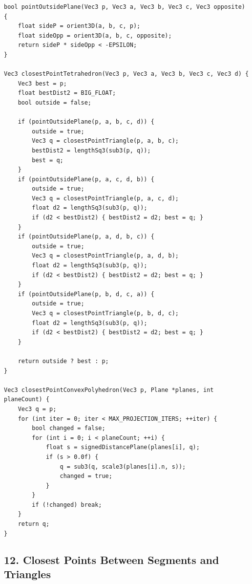 \documentclass[10pt,letterpaper]{article}
\begin{document}
\begin{verbatim}
bool pointOutsidePlane(Vec3 p, Vec3 a, Vec3 b, Vec3 c, Vec3 opposite) {
    float sideP = orient3D(a, b, c, p);
    float sideOpp = orient3D(a, b, c, opposite);
    return sideP * sideOpp < -EPSILON;
}

Vec3 closestPointTetrahedron(Vec3 p, Vec3 a, Vec3 b, Vec3 c, Vec3 d) {
    Vec3 best = p;
    float bestDist2 = BIG_FLOAT;
    bool outside = false;

    if (pointOutsidePlane(p, a, b, c, d)) {
        outside = true;
        Vec3 q = closestPointTriangle(p, a, b, c);
        bestDist2 = lengthSq3(sub3(p, q));
        best = q;
    }
    if (pointOutsidePlane(p, a, c, d, b)) {
        outside = true;
        Vec3 q = closestPointTriangle(p, a, c, d);
        float d2 = lengthSq3(sub3(p, q));
        if (d2 < bestDist2) { bestDist2 = d2; best = q; }
    }
    if (pointOutsidePlane(p, a, d, b, c)) {
        outside = true;
        Vec3 q = closestPointTriangle(p, a, d, b);
        float d2 = lengthSq3(sub3(p, q));
        if (d2 < bestDist2) { bestDist2 = d2; best = q; }
    }
    if (pointOutsidePlane(p, b, d, c, a)) {
        outside = true;
        Vec3 q = closestPointTriangle(p, b, d, c);
        float d2 = lengthSq3(sub3(p, q));
        if (d2 < bestDist2) { bestDist2 = d2; best = q; }
    }

    return outside ? best : p;
}

Vec3 closestPointConvexPolyhedron(Vec3 p, Plane *planes, int planeCount) {
    Vec3 q = p;
    for (int iter = 0; iter < MAX_PROJECTION_ITERS; ++iter) {
        bool changed = false;
        for (int i = 0; i < planeCount; ++i) {
            float s = signedDistancePlane(planes[i], q);
            if (s > 0.0f) {
                q = sub3(q, scale3(planes[i].n, s));
                changed = true;
            }
        }
        if (!changed) break;
    }
    return q;
}
\end{verbatim}


\subsection*{12. Closest Points Between Segments and Triangles}
\end{document}
